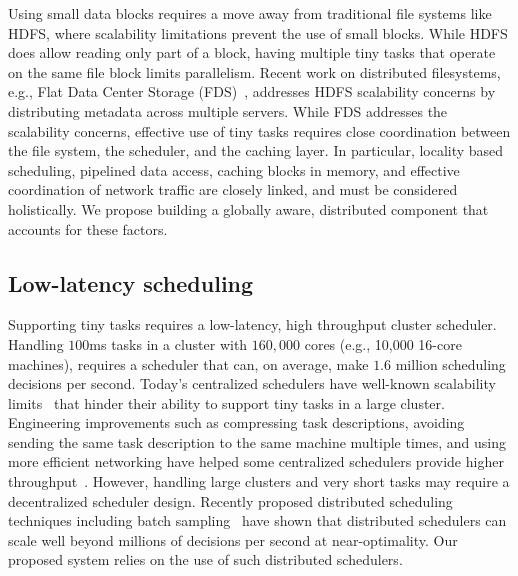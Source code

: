Using small data blocks requires a move away from traditional file systems like
HDFS, where scalability limitations prevent the use of small blocks.
While HDFS does allow reading only part of a block, having multiple tiny tasks
that operate on the same file block limits parallelism.
Recent work on distributed filesystems, e.g., Flat Data Center
Storage (FDS)~\cite{nightingale2012flat}, addresses HDFS scalability concerns by
distributing metadata across multiple servers. While FDS addresses the scalability
concerns, effective use of tiny tasks requires close coordination between the file
system, the scheduler, and the caching layer.
In particular, locality based scheduling, pipelined data access, caching blocks in 
memory, and effective coordination of network traffic are closely linked, and 
must be considered holistically. We propose building a globally aware, distributed
component that accounts for these factors.



\subsection{Low-latency scheduling}
Supporting tiny tasks requires a low-latency, high throughput cluster scheduler.
Handling $100$ms tasks in a cluster with $160,000$ cores
(e.g., 10,000 16-core machines),
requires a scheduler that can, on average, make $1.6$ million scheduling
decisions per second.
Today's centralized schedulers have well-known scalability
limits~\cite{wilkesberkeley} that
hinder their ability to support tiny tasks in a large cluster.
Engineering improvements such as compressing task descriptions,
avoiding sending the same task description to the same machine multiple
times, and using more efficient networking have helped some
centralized schedulers
provide higher throughput~\cite{zaharia2012meetup}.
However, handling large clusters and very
short tasks may require a decentralized scheduler design.
Recently proposed distributed scheduling techniques including batch
sampling~\cite{ousterhoutbatch} have shown that distributed schedulers
can scale well beyond millions of decisions per second at near-optimality.
Our proposed system relies on the use of such distributed schedulers.

